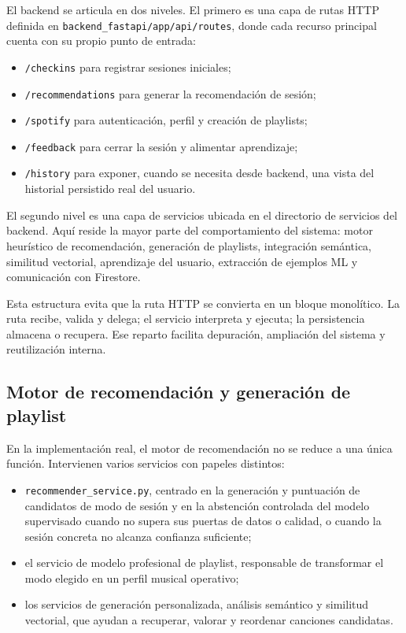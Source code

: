 El backend se articula en dos niveles. El primero es una capa de rutas HTTP
definida en \texttt{backend\_fastapi/app/api/routes}, donde cada recurso
principal cuenta con su propio punto de entrada:

\begin{itemize}
    \item \texttt{/checkins} para registrar sesiones iniciales;
    \item \texttt{/recommendations} para generar la recomendación de sesión;
    \item \texttt{/spotify} para autenticación, perfil y creación de playlists;
    \item \texttt{/feedback} para cerrar la sesión y alimentar aprendizaje;
    \item \texttt{/history} para exponer, cuando se necesita desde backend, una
    vista del historial persistido real del usuario.
\end{itemize}

El segundo nivel es una capa de servicios ubicada en el directorio de servicios
del backend. Aquí reside la mayor parte del comportamiento del sistema: motor
heurístico de recomendación, generación de playlists, integración semántica,
similitud vectorial, aprendizaje del usuario, extracción de ejemplos ML y
comunicación con Firestore.

Esta estructura evita que la ruta HTTP se convierta en un bloque monolítico. La
ruta recibe, valida y delega; el servicio interpreta y ejecuta; la persistencia
almacena o recupera. Ese reparto facilita depuración, ampliación del sistema y
reutilización interna.

\subsection{Motor de recomendación y generación de playlist}
\label{subsec:modulo_recomendacion_implementacion}

En la implementación real, el motor de recomendación no se reduce a una única
función. Intervienen varios servicios con papeles distintos:

\begin{itemize}
\item \texttt{recommender\_service.py}, centrado en la generación y
    puntuación de candidatos de modo de sesión y en la abstención controlada
    del modelo supervisado cuando no supera sus puertas de datos o calidad, o
    cuando la sesión concreta no alcanza confianza suficiente;
    \item el servicio de modelo profesional de playlist, responsable de
    transformar el modo elegido en un perfil musical operativo;
    \item los servicios de generación personalizada, análisis semántico y
    similitud vectorial, que ayudan a recuperar, valorar y reordenar canciones
    candidatas.
\end{itemize}

